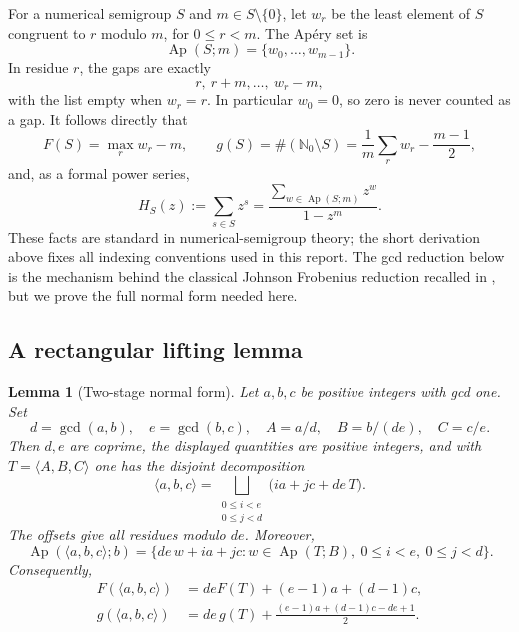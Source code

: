 \documentclass[11pt,a4paper]{article}
\numberwithin{equation}{section}
\newtheorem{lemma}[theorem]{Lemma}
\theoremstyle{definition}
\newcommand{\N}{\mathbb N_0}
\newcommand{\Ap}{\operatorname{Ap}}
\begin{document}
For a numerical semigroup $S$ and $m\in S\setminus\{0\}$, let $w_r$ be the
least element of $S$ congruent to $r$ modulo $m$, for $0\leq r<m$. The
Ap\'ery set is
\[
\Ap(S;m)=\{w_0,\ldots,w_{m-1}\}.
\]
In residue $r$, the gaps are exactly
\begin{equation}\label{pyf:eq:resgaps}
r,\ r+m,\ldots,\ w_r-m,
\end{equation}
with the list empty when $w_r=r$. In particular $w_0=0$, so zero is never
counted as a gap. It follows directly that
\begin{equation}\label{pyf:eq:apfacts}
F(S)=\max_r w_r-m,
\qquad
 g(S)=\#(\N\setminus S)=\frac1m\sum_r w_r-\frac{m-1}{2},
\end{equation}
and, as a formal power series,
\begin{equation}\label{pyf:eq:hilbert}
H_S(z):=\sum_{s\in S}z^s
=\frac{\sum_{w\in\Ap(S;m)}z^w}{1-z^m}.
\end{equation}
These facts are standard in numerical-semigroup theory; the short derivation
above fixes all indexing conventions used in this report. The gcd reduction
below is the mechanism behind the classical Johnson Frobenius reduction
recalled in \cite{rr}, but we prove the full normal form needed here.

\subsection{A rectangular lifting lemma}

\begin{lemma}[Two-stage normal form]\label{pyf:lem:lift}
Let $a,b,c$ be positive integers with gcd one. Set
\[
d=\gcd(a,b),\quad e=\gcd(b,c),\quad
 A=a/d,\quad B=b/(de),\quad C=c/e.
\]
Then $d,e$ are coprime, the displayed quantities are positive integers, and
with $T=\langle A,B,C\rangle$ one has the disjoint decomposition
\begin{equation}\label{pyf:eq:rect}
\langle a,b,c\rangle
=\bigsqcup_{\substack{0\leq i<e\\0\leq j<d}}
\bigl(ia+jc+de\,T\bigr).
\end{equation}
The offsets give all residues modulo $de$. Moreover,
\begin{equation}\label{pyf:eq:liftap}
\Ap(\langle a,b,c\rangle;b)
=\{de\,w+ia+jc:w\in\Ap(T;B),\ 0\leq i<e,\ 0\leq j<d\}.
\end{equation}
Consequently,
\begin{align}
F(\langle a,b,c\rangle)
 &=deF(T)+(e-1)a+(d-1)c,\label{pyf:eq:johnson}\\
g(\langle a,b,c\rangle)
 &=de\,g(T)+\frac{(e-1)a+(d-1)c-de+1}{2}.\label{pyf:eq:genuslift}
\end{align}
\end{lemma}
\end{document}
